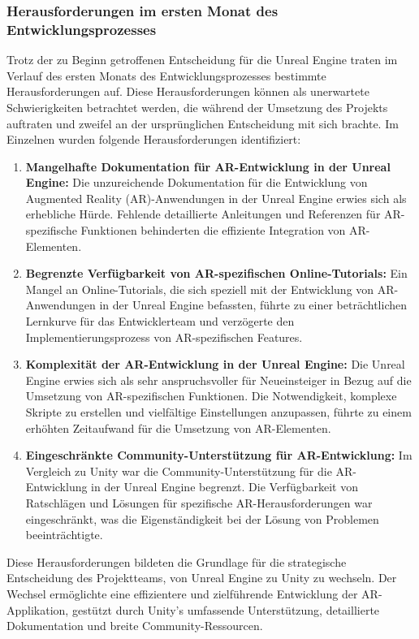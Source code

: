 \subsubsection*{Herausforderungen im ersten Monat des Entwicklungsprozesses}
Trotz der zu Beginn getroffenen Entscheidung für die Unreal Engine traten im Verlauf des ersten Monats des Entwicklungsprozesses
bestimmte Herausforderungen auf. Diese Herausforderungen können als unerwartete Schwierigkeiten betrachtet werden, die während
der Umsetzung des Projekts auftraten und zweifel an der ursprünglichen Entscheidung mit sich brachte.
Im Einzelnen wurden folgende Herausforderungen identifiziert:
\begin{enumerate}
    \item \textbf{Mangelhafte Dokumentation für AR-Entwicklung in der Unreal Engine:} Die unzureichende Dokumentation
    für die Entwicklung von Augmented Reality (AR)-Anwendungen in der Unreal Engine erwies sich als erhebliche Hürde.
    Fehlende detaillierte Anleitungen und Referenzen für AR-spezifische Funktionen behinderten die effiziente Integration von AR-Elementen.
    \item \textbf{Begrenzte Verfügbarkeit von AR-spezifischen Online-Tutorials:} Ein Mangel an Online-Tutorials,
    die sich speziell mit der Entwicklung von AR-Anwendungen in der Unreal Engine befassten, führte zu einer
    beträchtlichen Lernkurve für das Entwicklerteam und verzögerte den Implementierungsprozess von AR-spezifischen Features.
    \item \textbf{Komplexität der AR-Entwicklung in der Unreal Engine:} Die Unreal Engine erwies sich als sehr
    anspruchsvoller für Neueinsteiger in Bezug auf die Umsetzung von AR-spezifischen Funktionen. Die Notwendigkeit, komplexe Skripte zu
    erstellen und vielfältige Einstellungen anzupassen, führte zu einem erhöhten Zeitaufwand für die Umsetzung von AR-Elementen.
    \item \textbf{Eingeschränkte Community-Unterstützung für AR-Entwicklung:} Im Vergleich zu Unity war die Community-Unterstützung
    für die AR-Entwicklung in der Unreal Engine begrenzt. Die Verfügbarkeit von Ratschlägen und Lösungen für spezifische
    AR-Herausforderungen war eingeschränkt, was die Eigenständigkeit bei der Lösung von Problemen beeinträchtigte.
\end{enumerate}

Diese Herausforderungen bildeten die Grundlage für die strategische Entscheidung des Projektteams, von Unreal Engine
zu Unity zu wechseln. Der Wechsel ermöglichte eine effizientere und zielführende Entwicklung der AR-Applikation,
gestützt durch Unity's umfassende Unterstützung, detaillierte Dokumentation und breite Community-Ressourcen.


